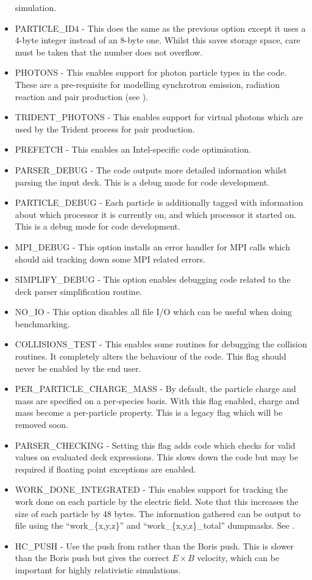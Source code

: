 \begin{itemize}
  simulation.
\item PARTICLE\_ID4 - This does the same as the previous option except it uses
  a 4-byte integer instead of an 8-byte one. Whilst this saves storage space,
  care must be taken that the number does not overflow.
\item PHOTONS - This enables support for photon particle types in the code.
  These are a pre-requisite for modelling synchrotron emission, radiation
  reaction and pair production (see ).
\item TRIDENT\_PHOTONS - This enables support for virtual photons which are
  used by the Trident process for pair production.
\item PREFETCH - This enables an Intel-specific code optimisation.
\item PARSER\_DEBUG - The code outputs more detailed information whilst
  parsing the input deck. This is a debug mode for code development.
\item PARTICLE\_DEBUG - Each particle is additionally tagged with information
  about which processor it is currently on, and which processor it started
  on. This is a debug mode for code development.
\item MPI\_DEBUG - This option installs an error handler for MPI calls which
  should aid tracking down some MPI related errors.
\item SIMPLIFY\_DEBUG - This option enables debugging code related to the
  deck parser simplification routine.
\item NO\_IO - This option disables all file I/O which can be useful when
  doing benchmarking.
\item COLLISIONS\_TEST - This enables some routines for debugging the collision
  routines. It completely alters the behaviour of the code. This flag should
  never be enabled by the end user.
\item PER\_PARTICLE\_CHARGE\_MASS - By default, the particle charge and
  mass are specified on a per-species basis. With this flag enabled, charge
  and mass become a per-particle property. This is a legacy flag which will
  be removed soon.
\item PARSER\_CHECKING - Setting this flag adds code which checks for valid
  values on evaluated deck expressions.
  This slows down the code but may be required if floating point exceptions
  are enabled.
\item WORK\_DONE\_INTEGRATED - This enables support for tracking the work done
  on each particle by the electric field. Note that this increases the size
  of each particle by 48 bytes. The information gathered can be output to
  file using the ``work\_\{x,y,z\}'' and ``work\_\{x,y,z\}\_total'' dumpmasks.
  See .
\item HC\_PUSH - Use the push from \citet{Higuera_Cary_2017}
  rather than the Boris push.
  This is slower than the Boris push but gives the correct $E\times B$
  velocity, which can be important for highly relativistic simulations.
\end{itemize}

